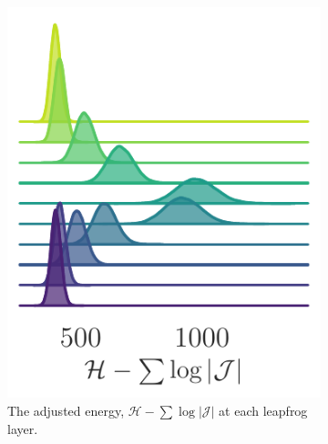 \documentclass{article} %
\begin{document}
\begin{figure}[hbpt]
\begin{subfigure}[b]{0.315\textwidth}
      \includegraphics[width=\textwidth]{figures/ridgeplots/hwf.pdf}
      \caption{\label{fig:hwf}The adjusted energy, \(\mathcal{H}-\sum\log|\mathcal{J}|\) at each leapfrog layer.}
   \end{subfigure}
   \hfill
   \begin{subfigure}[b]{0.315\textwidth}

\end{subfigure}
\end{figure}
\end{document}
